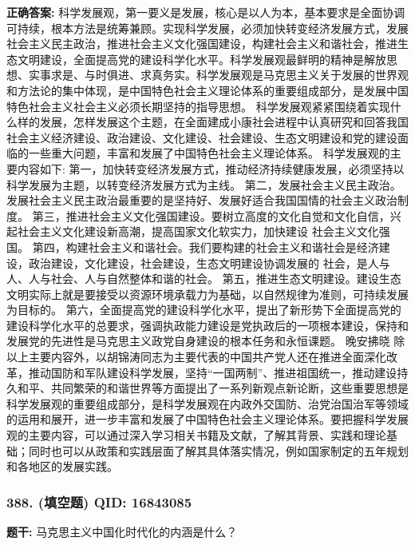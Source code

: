 \documentclass[12pt,UTF8]{ctexart}
\begin{document}
\textbf{正确答案:}
科学发展观，第一要义是发展，核心是以人为本，基本要求是全面协调可持续，根本方法是统筹兼顾。实现科学发展，必须加快转变经济发展方式，发展社会主义民主政治，推进社会主义文化强国建设，构建社会主义和谐社会，推进生态文明建设，全面提高党的建设科学化水平。科学发展观最鲜明的精神是解放思想、实事求是、与时俱进、求真务实。科学发展观是马克思主义关于发展的世界观和方法论的集中体现，是中国特色社会主义理论体系的重要组成部分，是发展中国特色社会主义社会主义必须长期坚持的指导思想。
科学发展观紧紧围绕着实现什么样的发展，怎样发展这个主题，在全面建成小康社会进程中认真研究和回答我国社会主义经济建设、政治建设、文化建设、社会建设、生态文明建设和党的建设面临的一些重大问题，丰富和发展了中国特色社会主义理论体系。
科学发展观的主要内容如下:
第一，加快转变经济发展方式，推动经济持续健康发展，必须坚持以科学发展为主题，以转变经济发展方式为主线。
第二，发展社会主义民主政治。发展社会主义民主政治最重要的是坚持好、发展好适合我国国情的社会主义政治制度。
第三，推进社会主义文化强国建设。要树立高度的文化自觉和文化自信，兴起社会主义文化建设新高潮，提高国家文化软实力，加快建设
社会主义文化强国。
第四，构建社会主义和谐社会。我们要构建的社会主义和谐社会是经济建设，政治建设，文化建设，社会建设，生态文明建设协调发展的
社会，是人与人、人与社会、人与自然整体和谐的社会。
第五，推进生态文明建设。建设生态文明实际上就是要接受以资源环境承载力为基础，以自然规律为准则，可持续发展为目标的。
第六，全面提高党的建设科学化水平，提出了新形势下全面提高党的建设科学化水平的总要求，强调执政能力建设是党执政后的一项根本建设，保持和发展党的先进性是马克思主义政党自身建设的根本任务和永恒课题。 晚安拂晓
除以上主要内容外，以胡锦涛同志为主要代表的中国共产党人还在推进全面深化改革，推动国防和军队建设科学发展，坚持“一国两制”、推进祖国统一，推动建设持久和平、共同繁荣的和谐世界等方面提出了一系列新观点新论断，这些重要思想是科学发展观的重要组成部分，是科学发展观在内政外交国防、治党治国治军等领域的运用和展开，进一步丰富和发展了中国特色社会主义理论体系。要把握科学发展观的主要内容，可以通过深入学习相关书籍及文献，了解其背景、实践和理论基础；同时也可以从政策和实践层面了解其具体落实情况，例如国家制定的五年规划和各地区的发展实践。

\vspace{0.3em}\hrulefill\vspace{0.7em}

\subsubsection*{388. (填空题) \small QID: 16843085}

\textbf{题干:}
马克思主义中国化时代化的内涵是什么？
\end{document}
